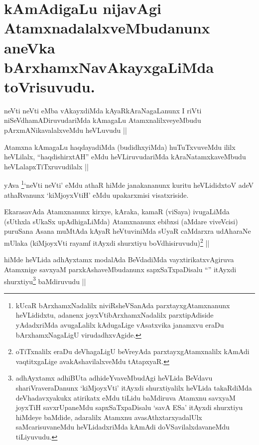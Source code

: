 \section*{kAmAdigaLu nijavAgi AtamxnadalalxveMbudanunx aneVka
  bArxhamxNavAkayxgaLiMda toVrisuvudu.}


\begin{artha}
neVti neVti eMba vAkayxdiMda kAyaRkAraNagaLanunx I riVti
niSeVdhamADiruvudariMda kAmagaLu AtamxnalilxveyeMbudu
pArxmANikavalalxveMdu heVLuvudu ||
\end{artha}


\begin{artha}
Atamxna kAmagaLu haqdayadiMda (budidhxyiMda) huTuTxvuveMdu ililx
heVLilalx, ``haqdishirxtAH'' eMdu heVLiruvudariMda kAraNatamxkaveMbudu
heVLalapxTiTxruvudilalx ||
\end{artha}

\begin{artha}
yAva \footnote{kUcaR bArxhamxNadalilx niviRsheVSanAda
  parxtayxgAtamxnanunx heVLididxtu, adanenx joyxVtibArxhamxNadalilx
  parxtipAdiside yAdadxriMda avugaLalilx kAdugaLige vAsatxvika
  janamxvu eraDu bArxhamxNagaLigU virudadhxvAgide.}`neVti neVti' eMdu athaR hiMde janakananunx kuritu heVLididxtoV
adeV athaRvanunx `kiMjoyxVtiH' eMdu upakarxmisi visatxriside. 
\end{artha}

\begin{artha}
EkarasavAda Atamxnanunx kirxye, kAraka, kamaR (viSaya) ivugaLiMda
(sUthxla sUkaSx upAdhigaLiMda) Atamxnanunx ebibxsi (aMdare viveVcisi)
puruSana Asana muMtAda kAyaR heVtuviniMda sUyaR caMdarxra udAharaNe
mUlaka (kiMjoyxVti rayamf itAyxdi shurxtiyu
boVdhisiruvudu)\footnote{oTiTxnalilx eraDu deVhagaLigU beVreyAda
  parxtayxgAtamxnalilx kAmAdi vaqtitxgaLige avakAshavilalxveMdu
  tAtapxyaR.} ||
\end{artha}

\begin{artha}
hiMde heVLida adhAyxtamx modalAda BeVdadiMda vayxtirikatxvAgiruva
Atamxnige savxyaM parxkAshaveMbudanunx sapxSaTxpaDisalu ``\stext''
itAyxdi shurxtiyu\footnote{adhAyxtamx adhiBUta adhideYvaveMbudAgi
  heVLida BeVdavu shariVraveraDanunx `kiMjoyxVti' itAyxdi
  shurxtiyalilx heVLida takaRdiMda deVhadavxyakukx atirikatx eMdu
  tiLidu baMdiruva Atamxnu savxyaM joyxTiH savxrUpaneMdu
  sapxSaTxpaDisalu `savA ESa' itAyxdi shurxtiyu hiMdeye baMdide,
  adaralilx Atamxnu avasAthxtarxyadalUlx saMcarisuvaneMdu
  heVLidadxriMda kAmAdi doVSavilalxdavaneMdu tiLiyuvudu.} baMdiruvudu ||
\end{artha}

